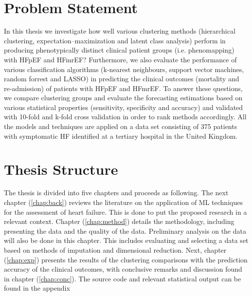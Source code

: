 \documentclass[../thesis.tex]{subfiles}
\begin{document}
\section{Problem Statement}
\label{sec:prob_stat}

\noindent In this thesis we investigate how well various clustering methods (hierarchical clustering, expectation–maximization and latent class analysis) perform in producing phenotypically distinct clinical patient groups (i.e. phenomapping) with HFpEF and HFmrEF? Furthermore, we also evaluate the performance of various classification algorithms (k-nearest neighbours, support vector machines, random forrest and LASSO) in predicting the clinical outcomes (mortality and re-admission) of patients with HFpEF and HFmrEF. To answer these questions, we compare clustering groups and evaluate the forecasting estimations based on various statistical properties (sensitivity, specificity and accuracy) and validated with 10-fold and k-fold cross validation in order to rank methods accordingly. All the models and techniques are applied on a data set consisting of 375 patients with symptomatic HF identified at a tertiary hospital in the United Kingdom.  

\section{Thesis Structure}
\label{sec:thesis_struc}

\noindent The thesis is divided into five chapters and proceeds as following. The next chapter (\ref{chap:back}) reviews the literature on the application of ML techniques for the assessment of heart failure. This is done to put the proposed research in a relevant context. Chapter (\ref{chap:method}) details the methodology, including presenting the data and the quality of the data. Preliminary analysis on the data will also be done in this chapter. This includes evaluating and selecting a data set based on methods of imputation and dimensional reduction. Next, chapter (\ref{chap:exp}) presents the results of the clustering comparisons with the prediction accuracy of the clinical outcomes, with conclusive remarks and discussion found in chapter (\ref{chap:conc}). The source code and relevant statistical output can be found in the appendix  
\end{document}
